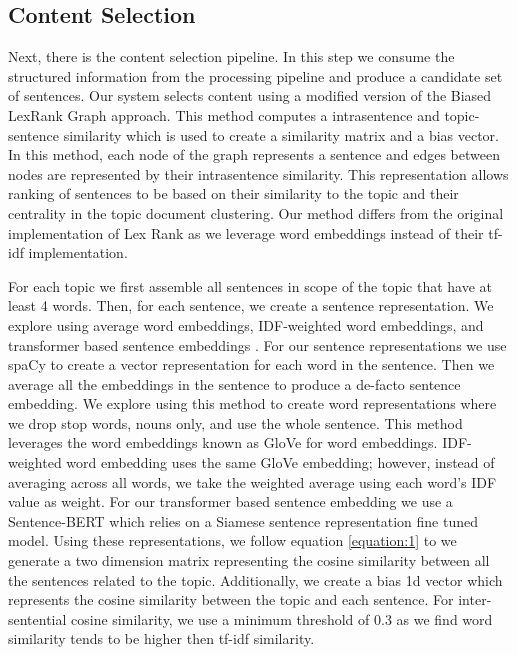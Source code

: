 \documentclass[11pt,a4paper]{article}
\begin{document}
\subsection{Content Selection}
Next, there is the content selection pipeline. In this step we consume the structured information from the processing pipeline and produce a candidate set of sentences. Our system selects content using a modified version of the Biased LexRank Graph approach. This method computes a intrasentence and topic-sentence similarity which is used to create a similarity matrix and a bias vector. In this method, each node of the graph represents a sentence and edges between nodes are represented by their intrasentence similarity. This representation allows ranking of sentences to be based on their similarity to the topic and their centrality in the topic document clustering. Our method differs from the original implementation of Lex
Rank \cite{otterbacher-etal-2005-using} as we leverage word embeddings instead of their tf-idf implementation.

For each topic we first assemble all sentences in scope of the topic that have at least 4 words. Then, for each sentence, we create a sentence representation. We explore using average word embeddings, IDF-weighted word embeddings, and transformer based sentence embeddings \cite{reimers-2019-sentence-bert}. For our sentence representations we use spaCy to create a vector representation for each word in the sentence. Then we average all the embeddings in the sentence to produce a de-facto sentence embedding. We explore using this method to create word representations where we drop stop words, nouns only, and use the whole sentence. This method leverages the word embeddings known as GloVe \cite{Pennington2014GloveGV} for word embeddings. IDF-weighted word embedding uses the same GloVe embedding; however, instead of averaging across all words, we take the weighted average using each word's IDF value as weight. For our transformer based sentence embedding we use a Sentence-BERT which relies on a Siamese sentence representation fine tuned model. Using these representations, we follow equation \ref{equation:1} to we generate a two dimension matrix representing the cosine similarity between all the sentences related to the topic. Additionally, we create a bias 1d vector which represents the cosine similarity between the topic and each sentence. For inter-sentential cosine similarity, we use a minimum threshold of 0.3 as we find word similarity tends to be higher then tf-idf similarity.
\end{document}
